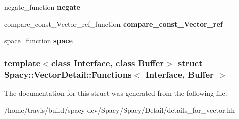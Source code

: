 \begin{DoxyCompactItemize}
\item 
\hypertarget{structSpacy_1_1VectorDetail_1_1Functions_a1e4f3514ecbd44171e7ff0f4cff9ea3c}{negate\-\_\-function {\bfseries negate}}\label{structSpacy_1_1VectorDetail_1_1Functions_a1e4f3514ecbd44171e7ff0f4cff9ea3c}

\item 
\hypertarget{structSpacy_1_1VectorDetail_1_1Functions_acd0a31ff3d1a4e8a9c0171975d652251}{compare\-\_\-const\-\_\-\-Vector\-\_\-ref\-\_\-function {\bfseries compare\-\_\-const\-\_\-\-Vector\-\_\-ref}}\label{structSpacy_1_1VectorDetail_1_1Functions_acd0a31ff3d1a4e8a9c0171975d652251}

\item 
\hypertarget{structSpacy_1_1VectorDetail_1_1Functions_a2dc7b27ed73dfd0450e45961f1d0a48b}{space\-\_\-function {\bfseries space}}\label{structSpacy_1_1VectorDetail_1_1Functions_a2dc7b27ed73dfd0450e45961f1d0a48b}

\end{DoxyCompactItemize}
\subsubsection*{template$<$class \-Interface, class \-Buffer$>$ struct Spacy\-::\-Vector\-Detail\-::\-Functions$<$ Interface, Buffer $>$}



\-The documentation for this struct was generated from the following file\-:\begin{DoxyCompactItemize}
\item 
/home/travis/build/spacy-\/dev/\-Spacy/\-Spacy/\-Detail/details\-\_\-for\-\_\-vector.\-hh\end{DoxyCompactItemize}
